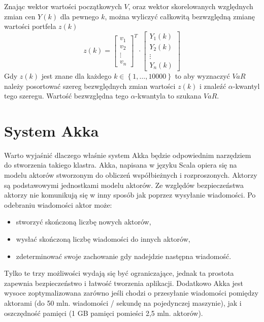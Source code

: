 \documentclass[12pt,titlepage]{article}
\numberwithin{equation}{section}
\begin{document}
Znając wektor wartości początkowych $V$, oraz wektor skorelowanych względnych zmian cen $Y(k)$ dla pewnego $k$, można wyliczyć całkowitą bezwzględną zmianę wartości portfela $z(k)$
\begin{equation}
    z(k) = \begin{bmatrix}
 v_1 \\ 
 v_2 \\
\vdots \\
v_n
\end{bmatrix}^T \cdot 
 \begin{bmatrix}
 Y_1(k) \\ 
  Y_2(k) \\
\vdots \\
Y_n(k)
\end{bmatrix}
\end{equation}
Gdy $z(k)$ jest znane dla każdego $k \in \left \{1, \hdots, 10000 \right \} $ to aby wyznaczyć $VaR$ należy posortować szereg bezwględnych zmian wartości $z(k)$ i znaleźć $\alpha$-kwantyl tego szeregu. Wartość bezwzględna tego $\alpha$-kwantyla to szukana $VaR$.

\newpage
\section{System Akka}
Warto wyjaśnić dlaczego właśnie system Akka będzie odpowiednim narzędziem do stworzenia takiego klastra. Akka, napisana w języku Scala opiera się na modelu aktorów stworzonym do obliczeń współbieżnych i rozproszonych. Aktorzy są podstawowymi jednostkami modelu aktorów. Ze względów bezpieczeństwa aktorzy nie komunikują się w inny sposób jak poprzez wysyłanie wiadomości. Po odebraniu wiadomości aktor może:

\begin{itemize}
  \item stworzyć skończoną liczbę nowych aktorów,
	\item wysłać skończoną liczbę wiadomości do innych aktorów,
	\item zdeterminować swoje zachowanie gdy nadejdzie następna wiadomość.

\end{itemize}
Tylko te trzy możliwości wydają się być ograniczające, jednak ta prostota zapewnia bezpieczeństwo i łatwość tworzenia aplikacji. 
Dodatkowo Akka jest wysoce zoptymalizowana zarówno jeśli chodzi o przesyłanie wiadomości pomiędzy aktorami (do 50 mln. wiadomości / sekundę na pojedynczej maszynie), jak i oszczędność pamięci (1 GB pamięci pomieści 2,5 mln. aktorów). 
\end{document}
